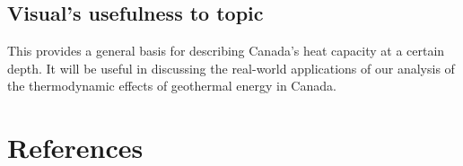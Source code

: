\documentclass[12pt,a4paper]{article}
\begin{document}
        
        \subsection{Visual's usefulness to topic}
            This provides a general basis for describing Canada's heat capacity at a certain depth. It will be useful in discussing the real-world applications of our analysis of the thermodynamic effects of geothermal energy in Canada.
		
    \section{References}
        \nocite{*}
        \printbibliography[heading=none]
\end{document}
